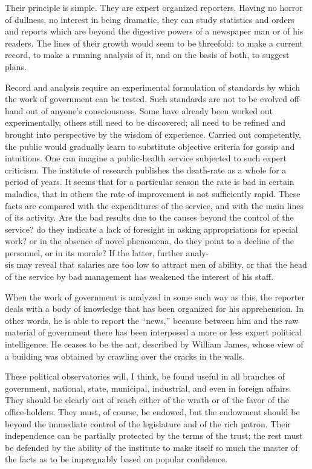 \documentclass[openany,nobib,nohyper]{tufte-book}
\begin{document}
Their principle is simple. They are expert organized reporters. Having
no horror of dullness, no interest in being dramatic, they can study
statistics and orders and reports which are beyond the digestive powers
of a newspaper man or of his readers. The lines of their growth would
seem to be threefold: to make a current record, to make a running
analysis of it, and on the basis of both, to suggest plans.

Record and analysis require an experimental formulation of standards by
which the work of government can be tested. Such standards are not to be
evolved off-hand out of anyone's consciousness. Some have already been
worked out experimentally, others still need to be discovered; all need
to be refined and brought into perspective by the wisdom of experience.
Carried out competently, the public would gradually learn to substitute
objective criteria for gossip and intuitions. One can imagine a
public-health service subjected to such expert criticism. The institute
of research publishes the death-rate as a whole for a period of years.
It seems that for a particular season the rate is bad in certain
maladies, that in others the rate of improvement is not sufficiently
rapid. These facts are compared with the expenditures of the service,
and with the main lines of its activity. Are the bad results due to the
causes beyond the control of the service? do they indicate a lack of
foresight in asking appropriations for special work? or in the absence
of novel phenomena, do they point to a decline of the personnel, or in
its morale? If the latter, further analy-\\ \noindent sis may reveal that salaries are
too low to attract men of ability, or that the head of the service by
bad management has weakened the interest of his staff.

When the work of government is analyzed in some such way as this, the
reporter deals with a body of knowledge that has been organized for his
apprehension. In other words, he is able to report the ``news,'' because
between him and the raw material of government there has been interposed
a more or less expert political intelligence. He ceases to be the ant,
described by William James, whose view of a building was obtained by
crawling over the cracks in the walls.

These political observatories will, I think, be found useful in all
branches of government, national, state, municipal, industrial, and even
in foreign affairs. They should be clearly out of reach either of the
wrath or of the favor of the office-holders. They must, of course, be
endowed, but the endowment should be beyond the immediate control of the
legislature and of the rich patron. Their independence can be partially
protected by the terms of the trust; the rest must be defended by the
ability of the institute to make itself so much the master of the facts
as to be impregnably based on popular confidence.
\end{document}
